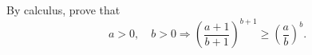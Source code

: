 By calculus, prove that
\[ a > 0,\quad b > 0 \Rightarrow \left(\frac{a + 1}{b + 1}\right)^{b+1} \geq \left(\frac{a}{b}\right)^b. \]
